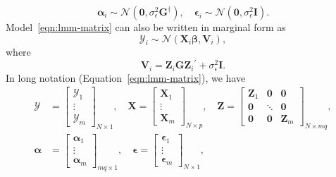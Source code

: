 \documentclass[cmfont,usenames,dvipsnames,leqno]{afit-etd}\usepackage[]{graphicx}\usepackage[]{color}
\newcommand{\trans}{\ensuremath{^\prime}}
\newcommand{\bc}[1]{\ensuremath{\bm{\mathcal{#1}}}}
\newcommand{\mc}[1]{\ensuremath{\mathcal{#1}}}
\newcommand{\X}{\ensuremath{\bm{X}}}
\newcommand{\Z}{\ensuremath{\bm{Z}}}
\begin{document}
\begin{equation*}
  \bm{\alpha}_i \sim \mc{N}\left(\bm{0}, \sigma_\epsilon^2\bm{G}^\dagger\right), \quad
  \bm{\epsilon}_i \sim \mc{N}\left(\bm{0}, \sigma_\epsilon^2\bm{I}\right).
\end{equation*}
Model~\eqref{eqn:lmm-matrix} can also be written in marginal form as
\begin{equation*}
  \bc{Y}_i \sim \mc{N}\left(\X_i\bm{\beta}, \bm{V}_i\right),
\end{equation*}
where 
\begin{equation*}
\bm{V}_i = \Z_i\bm{G}\Z_i\trans + \sigma_\epsilon^2\bm{I}. 
\end{equation*}
In long notation (Equation~\eqref{eqn:lmm-matrix}), we have
\begin{align*}
  \bc{Y} &= \begin{bmatrix} \bc{Y}_1 \\ \vdots \\ \bc{Y}_m \end{bmatrix}_{N \times 1}, \quad
  \X = \begin{bmatrix} \X_1 \\ \vdots \\ \X_m \end{bmatrix}_{N \times p}, \quad
\Z =
  \begin{bmatrix}
    \Z_1 & \bm{0} & \bm{0}   \\
    \bm{0}   & \ddots         & \bm{0}   \\
    \bm{0}   & \bm{0} & \Z_m
  \end{bmatrix}_{N \times mq}, \\
  \bm{\alpha} &= \begin{bmatrix} \bm{\alpha}_1 \\ \vdots \\ \bm{\alpha}_m \end{bmatrix}_{mq \times 1}, \quad 
   \bm{\epsilon} = \begin{bmatrix} \bm{\epsilon}_1 \\ \vdots \\ \bm{\epsilon}_m \end{bmatrix}_{N \times 1},
\end{align*}
\end{document}
